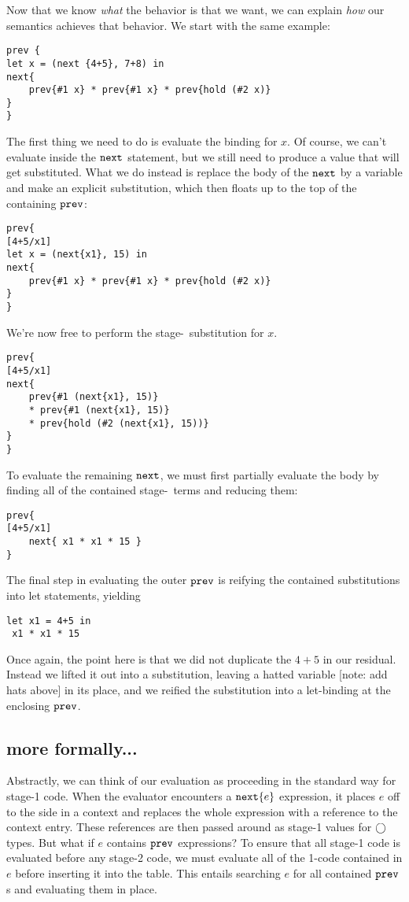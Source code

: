Now that we know {\em what} the behavior is that we want, we can explain {\em how} our semantics achieves that behavior.  We start with the same example:
\begin{lstlisting}
prev {
let x = (next {4+5}, 7+8) in
next{
	prev{#1 x} * prev{#1 x} * prev{hold (#2 x)}
}
}
\end{lstlisting}
The first thing we need to do is evaluate the binding for $x$.  Of course, we can't evaluate inside the ${\tt next}$ statement, but we still need to produce a value that will get substituted.  What we do instead is replace the body of the ${\tt next}$ by a variable and make an explicit substitution, which then floats up to the top of the containing ${\tt prev}$:
\begin{lstlisting} 
prev{
[4+5/x1]
let x = (next{x1}, 15) in
next{
	prev{#1 x} * prev{#1 x} * prev{hold (#2 x)}
}
}
\end{lstlisting}
We're now free to perform the stage-\bbone~substitution for $x$.  
\begin{lstlisting} 
prev{
[4+5/x1]
next{
	prev{#1 (next{x1}, 15)} 
	* prev{#1 (next{x1}, 15)} 
	* prev{hold (#2 (next{x1}, 15))}
}
}
\end{lstlisting}
To evaluate the remaining ${\tt next}$, we must first partially evaluate the body by finding all of the contained stage-\bbone~terms and reducing them:
\begin{lstlisting} 
prev{
[4+5/x1]
	next{ x1 * x1 * 15 }
}
\end{lstlisting}
The final step in evaluating the outer ${\tt prev}$ is reifying the contained substitutions into let statements, yielding
\begin{lstlisting} 
let x1 = 4+5 in
 x1 * x1 * 15
\end{lstlisting}

Once again, the point here is that we did not duplicate the $4+5$ in our residual.  
Instead we lifted it out into a substitution, leaving a hatted variable [note: add hats above] in its place,
and we reified the substitution into a let-binding at the enclosing ${\tt prev}$.

\subsection{more formally...}

Abstractly, we can think of our evaluation as proceeding in the standard way for stage-1 code. When the evaluator encounters a ${\tt next} \{e\}$ expression, it places $e$ off to the side in a context and replaces the whole expression with a reference to the context entry.  These references are then passed around as stage-1 values for $\bigcirc$ types.  But what if $e$ contains ${\tt prev}$ expressions?  To ensure that all stage-1 code is evaluated before any stage-2 code, we must evaluate all of the 1-code contained in $e$ before inserting it into the table.  This entails searching $e$ for all contained ${\tt prev}$s and evaluating them in place.  

